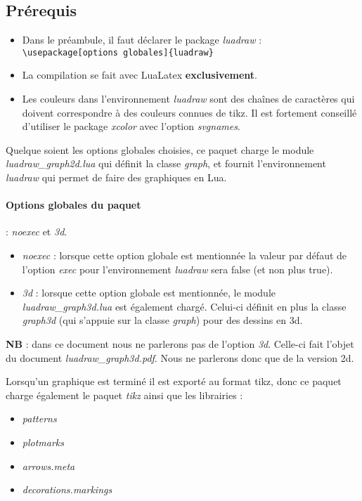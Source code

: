 \documentclass[%
10pt,%
a4paper,%
french,%
]%
{article}%
\begin{document}
\subsection{Prérequis}

\begin{itemize}
\item Dans le préambule, il faut déclarer le package \emph{luadraw} : \verb|\usepackage[options globales]{luadraw}|
\item La compilation se fait avec LuaLatex \textbf{exclusivement}.
\item Les couleurs dans l'environnement \emph{luadraw} sont des chaînes de caractères qui doivent correspondre à des couleurs connues de tikz. Il est fortement conseillé d'utiliser le package \emph{xcolor} avec l'option \emph{svgnames}.
\end{itemize}

Quelque soient les options globales choisies, ce paquet charge le module \emph{luadraw\_graph2d.lua} qui définit la classe \emph{graph}, et fournit l'environnement \emph{luadraw} qui permet de faire des graphiques en Lua.

\paragraph{Options globales du paquet} : \emph{noexec} et \emph{3d}.

\begin{itemize}
    \item \emph{noexec} : lorsque cette option globale est mentionnée la valeur par défaut de l'option \emph{exec} pour l'environnement \emph{luadraw} sera false (et non plus true).
    \item \emph{3d} : lorsque cette option globale est mentionnée, le module \emph{luadraw\_graph3d.lua} est également chargé. Celui-ci définit en plus la classe \emph{graph3d} (qui s'appuie sur la classe \emph{graph}) pour des dessins en 3d. 
\end{itemize}

\noindent\textbf{NB} : dans ce document nous ne parlerons pas de l'option \emph{3d}. Celle-ci fait l'objet du document \emph{luadraw\_graph3d.pdf}. Nous ne parlerons donc que de la version 2d.

Lorsqu'un graphique est terminé il est exporté au format tikz, donc ce paquet charge également le paquet \emph{tikz} ainsi que les librairies :
\begin{itemize}
\item\emph{patterns}
\item\emph{plotmarks}
\item\emph{arrows.meta}
\item\emph{decorations.markings}
\end{itemize}
\end{document}
